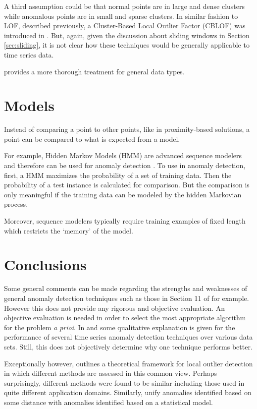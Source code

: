 A third assumption could be that normal points are in large and dense clusters while anomalous points are in small and sparse clusters. In similar fashion to LOF, described previously, a Cluster-Based Local Outlier Factor (CBLOF) was introduced in \cite{He2003}. But, again, given the discussion about sliding windows in Section \ref{sec:sliding}, it is not clear how these techniques would be generally applicable to time series data.

\cite{Chandola2009} provides a more thorough treatment for general data types.


\section{Models}

Instead of comparing a point to other points, like in proximity-based solutions, a point can be compared to what is expected from a model. 

For example, Hidden Markov Models (HMM) are advanced sequence modelers and therefore can be used for anomaly detection \cite{Zhang2003,Qiao2002,qiao2002anomaly,Florez-Larrahondo2005}. To use in anomaly detection, first, a HMM maximizes the probability of a set of training data. Then the probability of a test instance is calculated for comparison. But the comparison is only meaningful if the training data can be modeled by the hidden Markovian process.

Moreover, sequence modelers typically require training examples of fixed length which restricts the `memory' of the model.


\section{Conclusions} 

Some general comments can be made regarding the strengths and weaknesses of general anomaly detection techniques such as those in Section 11 of \cite{Chandola2009} for example. However this does not provide any rigorous and objective evaluation. An objective evaluation is needed in order to select the most appropriate algorithm for the problem \emph{a prioi}. In \cite{Cheboli2010} and \cite{Chandola2008} some qualitative explanation is given for the performance of several time series anomaly detection techniques over various data sets. Still, this does not objectively determine why one technique performs better.

Exceptionally however, \cite{Schubert2014} outlines a theoretical framework for local outlier detection in which different methods are assessed in this common view. Perhaps surprisingly, different methods were found to be similar including those used in quite different application domains. Similarly, \cite{knorr1997unified} unify anomalies identified based on some distance with anomalies identified based on a statistical model.

